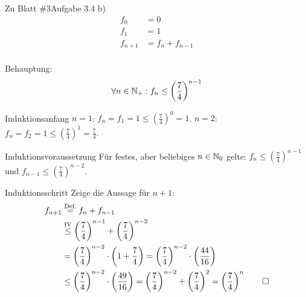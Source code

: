 \begin{frame}{Zu Blatt \#3}{Aufgabe 3.4 b)}
        \begin{align*}
            f_0 &= 0 \\
            f_1 &= 1 \\
            f_{n+1} &= f_n + f_{n-1} \\
        \end{align*}

    	Behauptung: \[\forall n \in \mathbb{N}_+ : f_n \le \left(\frac{7}{4}\right)^{n-1}\]
	\pause
	\begin{block}{Induktionsanfang}
		$n = 1$: $f_n = f_1 = 1 \le \left(\frac{7}{4}\right)^{0} = 1$. \;
		$n = 2$: $f_n = f_2 = 1 \le \left(\frac{7}{4}\right)^{1} = \frac{7}{4}$. \;
		\textbf{\checked}
	\end{block}
\end{frame}

\begin{frame}[t]	
	\begin{block}{Induktionsvoraussetzung}
		Für festes, aber beliebiges $n \in \mathbb{N}_0$ gelte: $f_n \le \left(\frac{7}{4}\right)^{n-1}$ und $f_{n-1} \le \left(\frac{7}{4}\right)^{n-2}$.
	\end{block}
    \pause
	\uncover<+->{}
	\begin{block}{Induktionsschritt}
		Zeige die Aussage für $n+1$:\\
		\begin{align*}
			f_{n+1} &\stackrel{\text{Def.}}{=} f_{n} + f_{n-1} \\
				&\stackrel{\text{IV}}{\le} \left(\frac{7}{4}\right)^{n-1} + \left(\frac{7}{4}\right)^{n-2}\\
				&= \left(\frac{7}{4}\right)^{n-2} \cdot \left(1 + \frac{7}{4}\right)
				= \left(\frac{7}{4}\right)^{n-2} \cdot \left(\frac{44}{16}\right) \\
				&\le \left(\frac{7}{4}\right)^{n-2} \cdot \left(\frac{49}{16}\right)
				= \left(\frac{7}{4}\right)^{n-2} + \left(\frac{7}{4}\right)^{2}
				= \left(\frac{7}{4}\right)^{n} \qed
		\end{align*}
	\end{block}
\end{frame}

	
